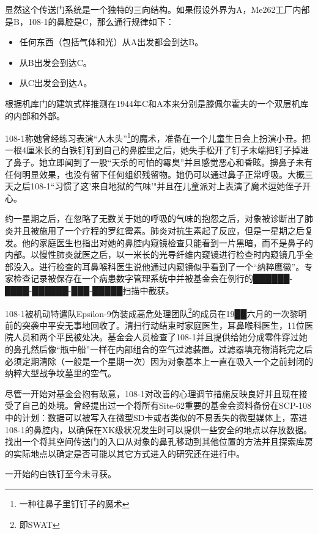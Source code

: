 显然这个传送门系统是一个独特的三向结构。如果假设外界为A，Me262工厂内部是B，108-1的鼻腔是C，那么通行规律如下：

\begin{itemize}
\item 任何东西（包括气体和光）从A出发都会到达B。
\item 从B出发会到达C。
\item 从C出发会到达A。
\end{itemize}

根据机库门的建筑式样推测在1944年C和A本来分别是滕佩尔霍夫的一个双层机库的内部和外部。

108-1称她曾经练习表演“人木头”\footnote{一种往鼻子里钉钉子的魔术}的魔术，准备在一个儿童生日会上扮演小丑。把一根4厘米长的白铁钉钉到自己的鼻腔里之后，她失手松开了钉子末端把钉子掉进了鼻子。她立即闻到了一股“天杀的可怕的霉臭”并且感觉恶心和昏眩。擤鼻子未有任何明显效果，也没有留下任何组织残留物。她仍可以通过鼻子正常呼吸。大概三天之后108-1“习惯了这'来自地狱的气味'"并且在儿童派对上表演了魔术逗她侄子开心。

约一星期之后，在忽略了无数关于她的呼吸的气味的抱怨之后，对象被诊断出了肺炎并且被施用了一个疗程的罗红霉素。肺炎对抗生素起了反应，但是一星期之后复发。他的家庭医生也指出对她的鼻腔内窥镜检查只能看到一片黑暗，而不是鼻子的内部。以慢性肺炎就医之后，以一米长的光导纤维内窥镜进行检查时内窥镜几乎全部没入。进行检查的耳鼻喉科医生说他通过内窥镜似乎看到了一个“纳粹鹰徽”。专家检查记录被保存在一个病患数字管理系统中并被基金会在例行的██████-████-██████-███-█████扫描中截获。

108-1被机动特遣队Epsilon-9伪装成高危处理团队\footnote{即SWAT}的成员在19██六月的一次黎明前的突袭中平安无事地回收了。清扫行动结束时家庭医生，耳鼻喉科医生，11位医院人员和两个平民被处决。基金会人员检查了108-1并且提供给她分成零件穿过她的鼻孔然后像“瓶中船”一样在内部组合的空气过滤装置。过滤器填充物消耗完之后必须定期清除（一般是一个星期一次）因为对象基本上一直在吸入一个之前封闭的纳粹大型战争坟墓里的空气。

尽管一开始对基金会抱有敌意，108-1对改善的心理调节措施反映良好并且现在接受了自己的处境。曾经提出过一个将所有Site-62重要的基金会资料备份在SCP-108中的计划：数据可以被写入在微型SD卡或者类似的不易丢失的微型媒体上，塞进108-1的鼻腔内，以确保在XK级状况发生时可以提供一些安全的地点以存放数据。找出一个将其空间传送门的入口从对象的鼻孔移动到其他位置的方法并且探索库房的实际地点以确定是否可能以其它方式进入的研究还在进行中。

一开始的白铁钉至今未寻获。
